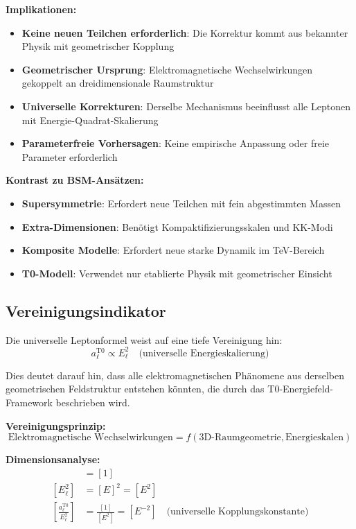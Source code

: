 \documentclass[12pt,a4paper]{report}
\begin{document}
	\textbf{Implikationen:}
	\begin{itemize}
		\item \textbf{Keine neuen Teilchen erforderlich}: Die Korrektur kommt aus bekannter Physik mit geometrischer Kopplung
		\item \textbf{Geometrischer Ursprung}: Elektromagnetische Wechselwirkungen gekoppelt an dreidimensionale Raumstruktur
		\item \textbf{Universelle Korrekturen}: Derselbe Mechanismus beeinflusst alle Leptonen mit Energie-Quadrat-Skalierung
		\item \textbf{Parameterfreie Vorhersagen}: Keine empirische Anpassung oder freie Parameter erforderlich
	\end{itemize}
	
	\textbf{Kontrast zu BSM-Ansätzen:}
	\begin{itemize}
		\item \textbf{Supersymmetrie}: Erfordert neue Teilchen mit fein abgestimmten Massen
		\item \textbf{Extra-Dimensionen}: Benötigt Kompaktifizierungsskalen und KK-Modi
		\item \textbf{Komposite Modelle}: Erfordert neue starke Dynamik im TeV-Bereich
		\item \textbf{T0-Modell}: Verwendet nur etablierte Physik mit geometrischer Einsicht
	\end{itemize}
	
	\subsection{Vereinigungsindikator}
	\label{subsec:unification_indicator}
	
	Die universelle Leptonformel weist auf eine tiefe Vereinigung hin:
	\begin{equation}
		a_\ell^{\text{T0}} \propto E_\ell^2 \quad \text{(universelle Energieskalierung)}
	\end{equation}
	
	Dies deutet darauf hin, dass alle elektromagnetischen Phänomene aus derselben geometrischen Feldstruktur entstehen könnten, die durch das T0-Energiefeld-Framework beschrieben wird.
	
	\textbf{Vereinigungsprinzip:}
	\begin{equation}
		\text{Elektromagnetische Wechselwirkungen} = f(\text{3D-Raumgeometrie}, \text{Energieskalen})
	\end{equation}
	
	\textbf{Dimensionsanalyse:}
	\begin{align}
		[a_\ell^{\text{T0}}] &= [1] \\
		[E_\ell^2] &= [E]^2 = [E^2] \\
		\left[\frac{a_\ell^{\text{T0}}}{E_\ell^2}\right] &= \frac{[1]}{[E^2]} = [E^{-2}] \quad \text{(universelle Kopplungskonstante)}
	\end{align}
	
\end{document}
